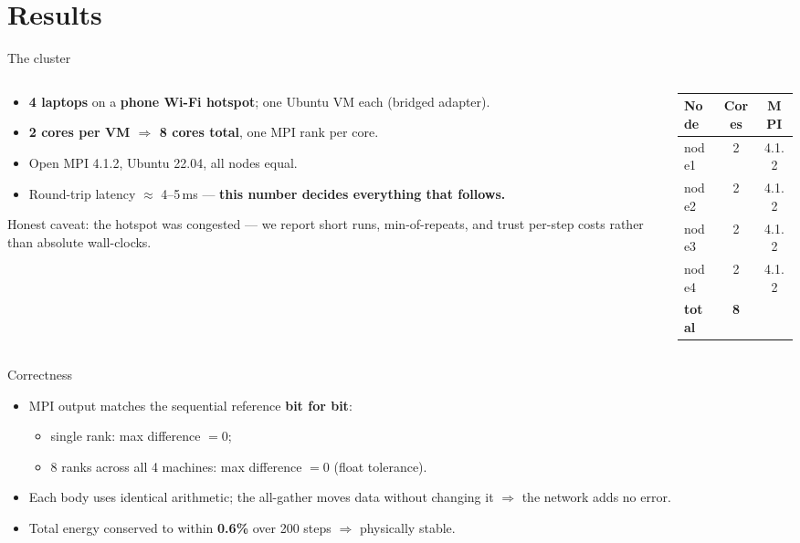 \documentclass[aspectratio=169]{beamer}
\begin{document}
\section{Results}
\begin{frame}{The cluster}
\begin{columns}
\begin{column}{0.54\textwidth}
\begin{itemize}
  \item \textbf{4 laptops} on a \textbf{phone Wi-Fi hotspot}; one Ubuntu VM each
        (bridged adapter).
  \item \textbf{2 cores per VM $\Rightarrow$ 8 cores total}, one MPI rank per core.
  \item Open MPI 4.1.2, Ubuntu 22.04, all nodes equal.
  \item Round-trip latency $\approx$ 4--5\,ms --- \textbf{this number decides
        everything that follows.}
\end{itemize}
\vspace{4pt}
\footnotesize Honest caveat: the hotspot was congested --- we report short runs,
min-of-repeats, and trust per-step costs rather than absolute wall-clocks.
\end{column}
\begin{column}{0.46\textwidth}
\centering\small
\begin{tabular}{@{}lcc@{}}
\toprule
Node & Cores & MPI \\
\midrule
node1 & 2 & 4.1.2 \\
node2 & 2 & 4.1.2 \\
node3 & 2 & 4.1.2 \\
node4 & 2 & 4.1.2 \\
\midrule
\textbf{total} & \textbf{8} & \\
\bottomrule
\end{tabular}
\end{column}
\end{columns}
\end{frame}

\begin{frame}{Correctness}
\begin{itemize}
  \item MPI output matches the sequential reference \textbf{bit for bit}:
        \begin{itemize}\footnotesize
          \item single rank: max difference $= 0$;
          \item 8 ranks across all 4 machines: max difference $= 0$ (float tolerance).
        \end{itemize}
  \item Each body uses identical arithmetic; the all-gather moves data without
        changing it $\Rightarrow$ the network adds no error.
  \item Total energy conserved to within \textbf{0.6\%} over 200 steps $\Rightarrow$
        physically stable.
\end{itemize}
\end{frame}
\end{document}
